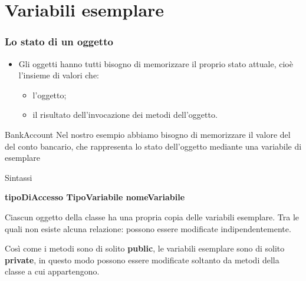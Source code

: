 \section*{Variabili esemplare}
\begin{frame}
\frametitle{Lo stato di un oggetto}
\begin{block}{}
\begin{itemize}
\item Gli oggetti hanno tutti bisogno di memorizzare il proprio stato attuale, cioè l'insieme di valori che:
\begin{itemize}
\item {} l'oggetto;
\item {} il risultato dell'invocazione dei metodi dell'oggetto.
\end{itemize}
\end{itemize}
\end{block}
\begin{block}{BankAccount}
Nel nostro esempio abbiamo bisogno di memorizzare il valore del  del conto bancario, che rappresenta
lo stato dell'oggetto mediante una  \alert{variabile di esemplare}
\end{block}
\end{frame}

\begin{frame}
\begin{block}{Sintassi}
\begin{center}
\textbf{tipoDiAccesso TipoVariabile nomeVariabile}
\end{center}
\end{block}
\begin{block}{}
Ciascun oggetto della classe ha una propria copia delle variabili esemplare.  Tra le quali non esiste \alert{alcuna 
relazione}: possono essere modificate indipendentemente.
\end{block}
\begin{block}{}
Così come i metodi sono di solito \textbf{public}, le variabili esemplare sono di solito \textbf{private}, in questo
modo possono essere modificate \alert{soltanto} da metodi della classe a cui appartengono.
\end{block}
\end{frame}

